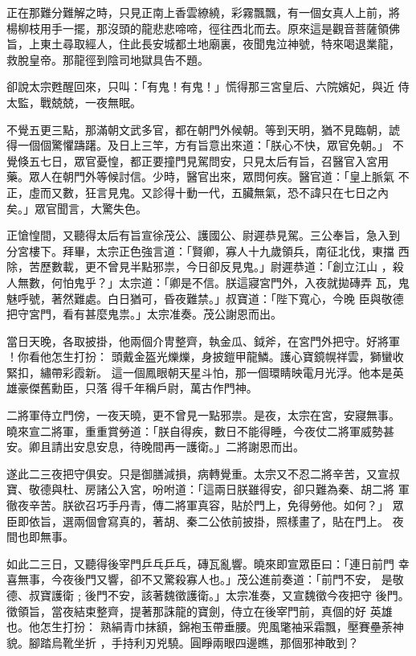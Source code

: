 \begin{pinyinscope}
{正在那難分難解之時，只見正南上香雲繚繞，彩霧飄飄，有一個女真人上前，將
楊柳枝用手一擺，那沒頭的龍悲悲啼啼，徑往西北而去。原來這是觀音菩薩領佛
旨，上東土尋取經人，住此長安城都土地廟裏，夜聞鬼泣神號，特來喝退業龍，
救脫皇帝。那龍徑到陰司地獄具告不題。

卻說太宗甦醒回來，只叫：「有鬼！有鬼！」慌得那三宮皇后、六院嬪妃，與近
侍太監，戰兢兢，一夜無眠。

不覺五更三點，那滿朝文武多官，都在朝門外候朝。等到天明，猶不見臨朝，諕
得一個個驚懼躊躇。及日上三竿，方有旨意出來道：「朕心不快，眾官免朝。」
不覺倏五七日，眾官憂惶，都正要撞門見駕問安，只見太后有旨，召醫官入宮用
藥。眾人在朝門外等候討信。少時，醫官出來，眾問何疾。醫官道：「皇上脈氣
不正，虛而又數，狂言見鬼。又診得十動一代，五臟無氣，恐不諱只在七日之內
矣。」眾官聞言，大驚失色。

正愴惶間，又聽得太后有旨宣徐茂公、護國公、尉遲恭見駕。三公奉旨，急入到
分宮樓下。拜畢，太宗正色強言道：「賢卿，寡人十九歲領兵，南征北伐，東擋
西除，苦歷數載，更不曾見半點邪祟，今日卻反見鬼。」尉遲恭道：「創立江山
，殺人無數，何怕鬼乎？」太宗道：「卿是不信。朕這寢宮門外，入夜就拋磚弄
瓦，鬼魅呼號，著然難處。白日猶可，昏夜難禁。」叔寶道：「陛下寬心，今晚
臣與敬德把守宮門，看有甚麼鬼祟。」太宗准奏。茂公謝恩而出。

當日天晚，各取披掛，他兩個介冑整齊，執金瓜、鉞斧，在宮門外把守。好將軍
！你看他怎生打扮：
頭戴金盔光爍爍，身披鎧甲龍鱗。護心寶鏡幌祥雲，獅蠻收緊扣，繡帶彩霞新。
這一個鳳眼朝天星斗怕，那一個環睛映電月光浮。他本是英雄豪傑舊勳臣，只落
得千年稱戶尉，萬古作門神。

二將軍侍立門傍，一夜天曉，更不曾見一點邪祟。是夜，太宗在宮，安寢無事。
曉來宣二將軍，重重賞勞道：「朕自得疾，數日不能得睡，今夜仗二將軍威勢甚
安。卿且請出安息安息，待晚間再一護衛。」二將謝恩而出。

遂此二三夜把守俱安。只是御膳減損，病轉覺重。太宗又不忍二將辛苦，又宣叔
寶、敬德與杜、房諸公入宮，吩咐道：「這兩日朕雖得安，卻只難為秦、胡二將
軍徹夜辛苦。朕欲召巧手丹青，傳二將軍真容，貼於門上，免得勞他。如何？」
眾臣即依旨，選兩個會寫真的，著胡、秦二公依前披掛，照樣畫了，貼在門上。
夜間也即無事。

如此二三日，又聽得後宰門乒乓乒乓，磚瓦亂響。曉來即宣眾臣曰：「連日前門
幸喜無事，今夜後門又響，卻不又驚殺寡人也。」茂公進前奏道：「前門不安，
是敬德、叔寶護衛﹔後門不安，該著魏徵護衛。」太宗准奏，又宣魏徵今夜把守
後門。徵領旨，當夜結束整齊，提著那誅龍的寶劍，侍立在後宰門前，真個的好
英雄也。他怎生打扮：
熟絹青巾抹額，錦袍玉帶垂腰。兜風氅袖采霜飄，壓賽壘荼神貌。腳踏烏靴坐折
，手持利刃兇驍。圓睜兩眼四邊瞧，那個邪神敢到？

}
\end{pinyinscope}
